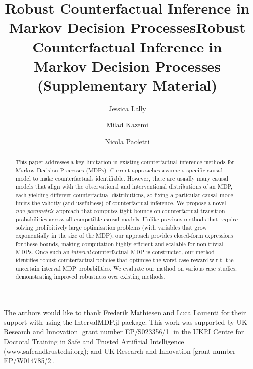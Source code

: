 \documentclass[accepted]{main}
\title{Robust Counterfactual Inference in Markov Decision Processes}
\author[1]{\href{mailto:<jessica.lally@kcl.ac.uk>?Subject=Robust Counterfactual Inference in MDPs}{Jessica Lally}{}}
\author[1]{Milad Kazemi}
\author[1]{Nicola Paoletti}
\affil[1]{%
    Department of Informatics\\
    King's College London\\
    London, UK
}
\begin{document}
\maketitle
\begin{abstract}
  This paper addresses a key limitation in existing counterfactual inference methods for Markov Decision Processes (MDPs). Current approaches assume a specific causal model to make counterfactuals identifiable. However, there are usually many causal models that align with the observational and interventional distributions of an MDP, each yielding different counterfactual distributions, so fixing a particular causal model limits the validity (and usefulness) of counterfactual inference. We propose a novel \textit{non-parametric} approach that computes tight bounds on counterfactual transition probabilities across all compatible causal models. Unlike previous methods that require solving prohibitively large optimisation problems (with variables that grow exponentially in the size of the MDP), our approach provides closed-form expressions for these bounds, making computation highly efficient and scalable for non-trivial MDPs. Once such an \textit{interval} counterfactual MDP is constructed, our method identifies robust counterfactual policies that optimise the worst-case reward w.r.t. the uncertain interval MDP probabilities. We evaluate our method on various case studies, demonstrating improved robustness over existing methods.
\end{abstract}















\begin{acknowledgements}
The authors would like to thank Frederik Mathiesen and 
Luca Laurenti for their support with using the IntervalMDP.jl package. This work was supported by UK Research and Innovation [grant number EP/S023356/1] in the UKRI Centre for Doctoral Training in Safe and Trusted Artificial Intelligence (www.safeandtrustedai.org); and UK Research and Innovation [grant number EP/W014785/2].
\end{acknowledgements}

%


\newpage

\onecolumn

\title{Robust Counterfactual Inference in Markov Decision Processes\\(Supplementary Material)}
\maketitle

\appendix

\end{document}
